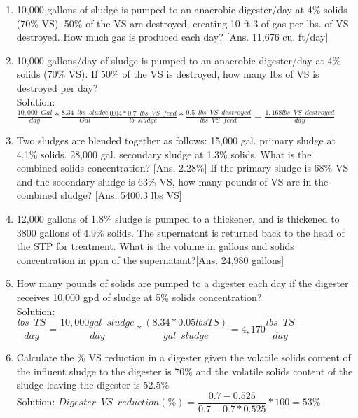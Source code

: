 \documentclass{article}
\begin{document}
\begin{enumerate}
\item 10,000 gallons of sludge is pumped to an anaerobic digester/day at 4\% solids (70\% VS).  50\% of the VS are destroyed, creating 10 ft.3 of gas per lbs. of VS destroyed. How much gas is produced each day? [Ans. 11,676 cu. ft/day]

\item 10,000 gallons/day of sludge is pumped to an anaerobic digester/day at 4\% solids (70\% VS).  If 50\% of the VS is destroyed, how many lbs of VS is destroyed per day?\\
Solution:\\
$\frac{10,000 \enspace Gal}{day}*\frac{8.34 \enspace lbs \enspace sludge}{Gal} \frac{0.04*0.7 \enspace lbs \enspace VS \enspace feed}{lb \enspace sludge}*\frac{0.5 \enspace lbs \enspace VS \enspace destroyed}{lbs \enspace VS \enspace feed}=\boxed{\frac{1,168lbs \enspace VS \enspace destroyed}{day} } $


\item Two sludges are blended together as follows: 15,000 gal. primary sludge at 4.1\% solids. 28,000 gal. secondary sludge at 1.3\% solids. 
What is the combined solids concentration? [Ans. 2.28\%]
If the primary sludge is 68\% VS and the secondary sludge is 63\% VS, how many pounds of VS are in the combined sludge? [Ans. 5400.3 lbs VS]


\item 12,000 gallons of 1.8\% sludge is pumped to a thickener, and is thickened to 3800 gallons of 4.9\% solids. The supernatant is returned back to the head of the STP for treatment.  What is the volume in gallons and solids concentration in ppm of the supernatant?[Ans. 24,980 gallons]


\item How many pounds of solids are pumped to a digester each day if the digester receives 10,000 gpd of sludge at 5\% solids concentration?\\


 

Solution:\\

{
$
	\dfrac{lbs \enspace TS}{day}
	=
	\dfrac{10,000 gal \enspace sludge}{day}
	*
	\dfrac{(8.34*0.05 lbs TS )}{gal \enspace sludge}
	=4,170
	\dfrac{lbs \enspace TS}{day}
$
}\\


\item Calculate the \% VS reduction in a digester given the volatile solids content of the influent sludge to the digester is 70\% and the volatile solids content of the sludge leaving the digester is 52.5\%\\
Solution:  $Digester \enspace VS \enspace reduction (\%)=\dfrac{0.7-0.525}{0.7-0.7*0.525}*100=\boxed{ 53\%}$\\


\end{enumerate}
\end{document}
